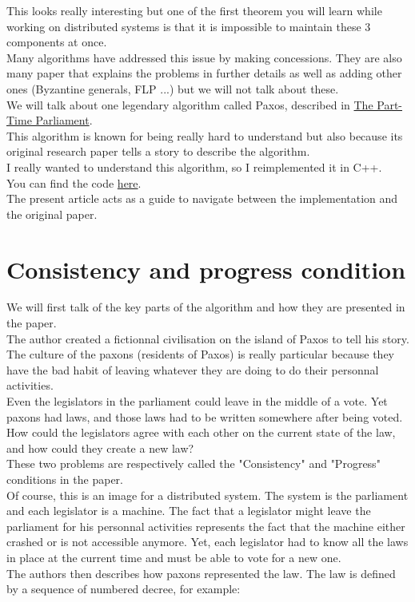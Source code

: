 \documentclass{article}
\begin{document}
This looks really interesting but one of the first theorem you will learn while working on distributed systems is that it is impossible to maintain these 3 components at once.\\
Many algorithms have addressed this issue by making concessions. They are also many paper that explains the problems in further details as well as adding other ones (Byzantine generals, FLP ...) but we will not talk about these.\\
We will talk about one legendary algorithm called Paxos, described in \href{https://lamport.azurewebsites.net/pubs/lamport-paxos.pdf}{The Part-Time Parliament}.\\
This algorithm is known for being really hard to understand but also because its original research paper tells a story to describe the algorithm.\\
I really wanted to understand this algorithm, so I reimplemented it in C++.\\
You can find the code \href{https://github.com/Azomasiel/paxos}{here}.\\
The present article acts as a guide to navigate between the implementation and the original paper.
\pagebreak

\section{Consistency and progress condition}
We will first talk of the key parts of the algorithm and how they are presented in the paper.\\
The author created a fictionnal civilisation on the island of Paxos to tell his story. The culture of the paxons (residents of Paxos) is really particular because they have the bad habit of leaving whatever they are doing to do their personnal activities.\\
Even the legislators in the parliament could leave in the middle of a vote. Yet paxons had laws, and those laws had to be written somewhere after being voted. How could the legislators agree with each other on the current state of the law, and how could they create a new law?\\
These two problems are respectively called the "Consistency" and "Progress" conditions in the paper.\\
Of course, this is an image for a distributed system. The system is the parliament and each legislator is a machine. The fact that a legislator might leave the parliament for his personnal activities represents the fact that the machine either crashed or is not accessible anymore. Yet, each legislator had to know all the laws in place at the current time and must be able to vote for a new one.\\
The authors then describes how paxons represented the law. The law is defined by a sequence of numbered decree, for example:
\end{document}
